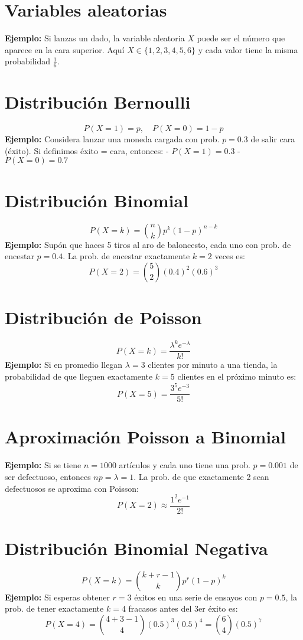 \documentclass[10pt]{article}
\begin{document}
	\begin{multicols}{2}
		
		\section*{Variables aleatorias}
		\textbf{Ejemplo:}  
		Si lanzas un dado, la variable aleatoria $X$ puede ser el número que aparece en la cara superior. Aquí $X \in \{1,2,3,4,5,6\}$ y cada valor tiene la misma probabilidad $\frac{1}{6}$.
		
		\section*{Distribución Bernoulli}
		\[
		P(X=1)=p,\quad P(X=0)=1-p
		\]
		\textbf{Ejemplo:}  
		Considera lanzar una moneda cargada con prob. $p=0.3$ de salir cara (éxito). Si definimos éxito = cara, entonces:
		- $P(X=1)=0.3$  
		- $P(X=0)=0.7$
		
		\section*{Distribución Binomial}
		\[
		P(X=k)=\binom{n}{k}p^k(1-p)^{n-k}
		\]
		\textbf{Ejemplo:}  
		Supón que haces 5 tiros al aro de baloncesto, cada uno con prob. de encestar $p=0.4$. La prob. de encestar exactamente $k=2$ veces es:
		\[
		P(X=2)=\binom{5}{2}(0.4)^2(0.6)^3
		\]
		
		\section*{Distribución de Poisson}
		\[
		P(X=k)=\frac{\lambda^k e^{-\lambda}}{k!}
		\]
		\textbf{Ejemplo:}  
		Si en promedio llegan $\lambda=3$ clientes por minuto a una tienda, la probabilidad de que lleguen exactamente $k=5$ clientes en el próximo minuto es:
		\[
		P(X=5)=\frac{3^5 e^{-3}}{5!}
		\]
		
		\section*{Aproximación Poisson a Binomial}
		\textbf{Ejemplo:}  
		Si se tiene $n=1000$ artículos y cada uno tiene una prob. $p=0.001$ de ser defectuoso, entonces $np=\lambda=1$.  
		La prob. de que exactamente 2 sean defectuosos se aproxima con Poisson:
		\[
		P(X=2)\approx\frac{1^2 e^{-1}}{2!}
		\]
		
		\section*{Distribución Binomial Negativa}
		\[
		P(X=k)=\binom{k+r-1}{k}p^r(1-p)^k
		\]
		\textbf{Ejemplo:}  
		Si esperas obtener $r=3$ éxitos en una serie de ensayos con $p=0.5$, la prob. de tener exactamente $k=4$ fracasos antes del 3er éxito es:
		\[
		P(X=4)=\binom{4+3-1}{4}(0.5)^3(0.5)^4
		=\binom{6}{4}(0.5)^7
		\]
		

\end{multicols}
\end{document}
